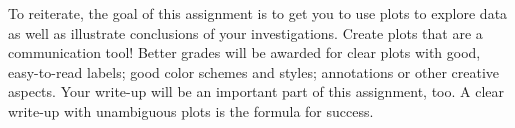 \documentclass[12pt, letterpaper]{article}
\begin{document}
To reiterate, the goal of this assignment is to get you to use plots to
explore data as well as illustrate conclusions of your investigations.  Create
plots that are a communication tool!  Better grades will be awarded for
clear plots with good, easy-to-read labels; good color schemes and styles;
annotations or other creative aspects.  Your write-up will be an important
part of this assignment, too.  A clear write-up with unambiguous plots is
the formula for success.
\end{document}
